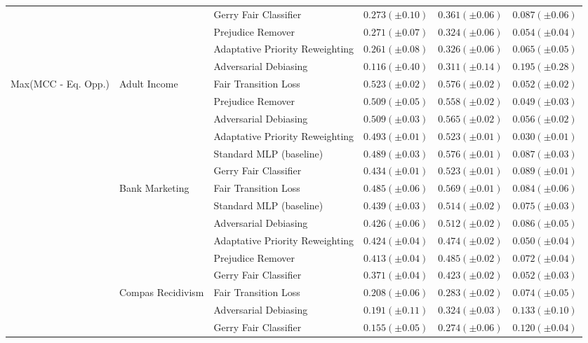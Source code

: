 \begin{tabular}{llllll}
 &  & Gerry Fair Classifier & $0.273 (\pm0.10)$ & $0.361 (\pm0.06)$ & $0.087 (\pm0.06)$ \\
 &  & Prejudice Remover & $0.271 (\pm0.07)$ & $0.324 (\pm0.06)$ & $0.054 (\pm0.04)$ \\
 &  & Adaptative Priority Reweighting & $0.261 (\pm0.08)$ & $0.326 (\pm0.06)$ & $0.065 (\pm0.05)$ \\
 &  & Adversarial Debiasing & $0.116 (\pm0.40)$ & $0.311 (\pm0.14)$ & $0.195 (\pm0.28)$ \\
\cline{1-6} \cline{2-6}
\multirow[t]{24}{*}{Max(MCC - Eq. Opp.)} & \multirow[t]{6}{*}{Adult Income} & Fair Transition Loss & $0.523 (\pm0.02)$ & $0.576 (\pm0.02)$ & $0.052 (\pm0.02)$ \\
 &  & Prejudice Remover & $0.509 (\pm0.05)$ & $0.558 (\pm0.02)$ & $0.049 (\pm0.03)$ \\
 &  & Adversarial Debiasing & $0.509 (\pm0.03)$ & $0.565 (\pm0.02)$ & $0.056 (\pm0.02)$ \\
 &  & Adaptative Priority Reweighting & $0.493 (\pm0.01)$ & $0.523 (\pm0.01)$ & $0.030 (\pm0.01)$ \\
 &  & Standard MLP (baseline) & $0.489 (\pm0.03)$ & $0.576 (\pm0.01)$ & $0.087 (\pm0.03)$ \\
 &  & Gerry Fair Classifier & $0.434 (\pm0.01)$ & $0.523 (\pm0.01)$ & $0.089 (\pm0.01)$ \\
\cline{2-6}
 & \multirow[t]{6}{*}{Bank Marketing} & Fair Transition Loss & $0.485 (\pm0.06)$ & $0.569 (\pm0.01)$ & $0.084 (\pm0.06)$ \\
 &  & Standard MLP (baseline) & $0.439 (\pm0.03)$ & $0.514 (\pm0.02)$ & $0.075 (\pm0.03)$ \\
 &  & Adversarial Debiasing & $0.426 (\pm0.06)$ & $0.512 (\pm0.02)$ & $0.086 (\pm0.05)$ \\
 &  & Adaptative Priority Reweighting & $0.424 (\pm0.04)$ & $0.474 (\pm0.02)$ & $0.050 (\pm0.04)$ \\
 &  & Prejudice Remover & $0.413 (\pm0.04)$ & $0.485 (\pm0.02)$ & $0.072 (\pm0.04)$ \\
 &  & Gerry Fair Classifier & $0.371 (\pm0.04)$ & $0.423 (\pm0.02)$ & $0.052 (\pm0.03)$ \\
\cline{2-6}
 & \multirow[t]{6}{*}{Compas Recidivism} & Fair Transition Loss & $0.208 (\pm0.06)$ & $0.283 (\pm0.02)$ & $0.074 (\pm0.05)$ \\
 &  & Adversarial Debiasing & $0.191 (\pm0.11)$ & $0.324 (\pm0.03)$ & $0.133 (\pm0.10)$ \\
 &  & Gerry Fair Classifier & $0.155 (\pm0.05)$ & $0.274 (\pm0.06)$ & $0.120 (\pm0.04)$ \\

\end{tabular}
